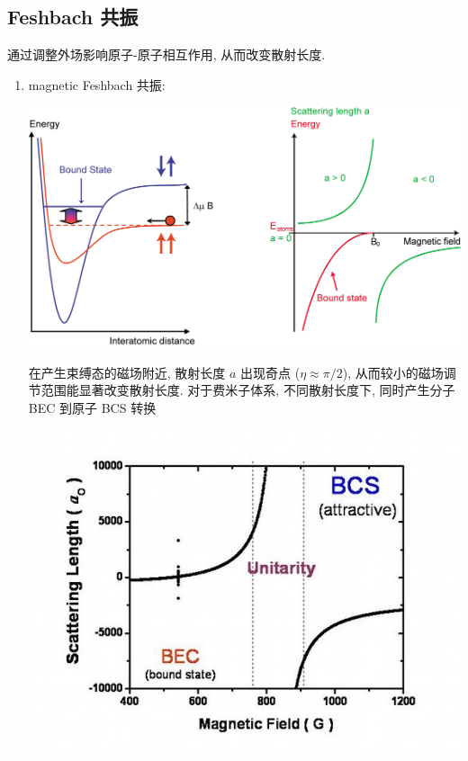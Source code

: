 \documentclass[10pt,a4paper,twocolumn]{article} %
\numberwithin{equation}{section} %
\begin{document}
\subsection{Feshbach 共振} %
\label{sub:feshbach_resonance}
通过调整外场影响原子-原子相互作用, 从而改变散射长度.
\begin{enumerate}
	\item magnetic Feshbach 共振: \\
	\begin{centering}
		\includegraphics[width = \linewidth]{Feshbach.jpg}
	\end{centering}
	在产生束缚态的磁场附近, 散射长度 $a$ 出现奇点 ($\eta \approx \pi/2$), 
	从而较小的磁场调节范围能显著改变散射长度. 对于费米子体系, 不同散射长度下, 
	同时产生分子 BEC 到原子 BCS 转换\\
	\begin{centering}
		\includegraphics[width=\linewidth]{bec_bcs.jpg}

\end{centering}
\end{enumerate}
\end{document}
